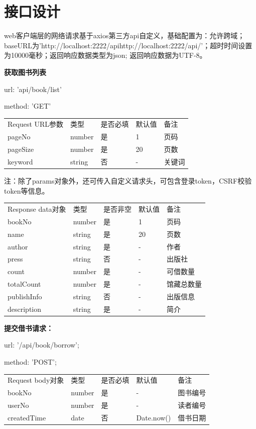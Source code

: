 \section{接口设计}
web客户端层的网络请求基于axios第三方api自定义，基础配置为：允许跨域；baseURL为'http://localhost:2222/apihttp://localhost:2222/api/'；超时时间设置为10000毫秒；返回响应数据类型为json; 返回响应数据为UTF-8。

\textbf{获取图书列表}

url: 'api/book/list'

method: 'GET'

\begin{tabular}{lllll|}
    \hline
    Request URL参数& 类型& 是否必填& 默认值 & 备注\\
    pageNo & number & 是& 1& 页码\\
    pageSize & number & 是& 20& 页数\\
    keyword& string& 否& -& 关键词\\
    \hline
\end{tabular}

注：除了params对象外，还可传入自定义请求头，可包含登录token，CSRF校验token等信息。

\begin{tabular}{lllll}
    \hline
    Response data对象& 类型& 是否非空& 默认值 & 备注\\
    
    bookNo & number & 是& 1& 页码\\
    
    name & string& 是& 20& 页数\\
    
    author& string& 是& -& 作者\\
   
    press& string& 否& -& 出版社\\
    
    count& number& 是& -& 可借数量\\
    totalCount& number& 是& -& 馆藏总数量\\
    publishInfo& string& 否& -& 出版信息\\
    description& string& 是& -& 简介\\
    \hline
\end{tabular}

\textbf{提交借书请求：}

url: '/api/book/borrow';

method: 'POST';

\begin{tabular}{lllll}
    \hline
    Request body对象& 类型& 是否必填& 默认值 & 备注\\
    bookNo & number& 是& -& 图书编号\\
    userNo & number& 是& -& 读者编号\\
    createdTime& date& 否& Date.now()& 借书日期\\
    \hline
\end{tabular}

